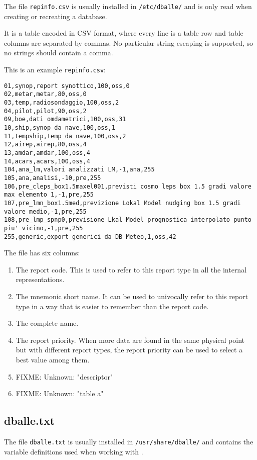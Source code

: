 The file {\tt repinfo.csv} is usually installed in {\tt /etc/dballe/} and is
only read when creating or recreating a database.

It is a table encoded in CSV format, where every line is a table row and table
columns are separated by commas.  No particular string escaping is supported,
so no strings should contain a comma.

This is an example {\tt repinfo.csv}:

\begin{verbatim}
01,synop,report synottico,100,oss,0
02,metar,metar,80,oss,0
03,temp,radiosondaggio,100,oss,2
04,pilot,pilot,90,oss,2
09,boe,dati omdametrici,100,oss,31
10,ship,synop da nave,100,oss,1
11,tempship,temp da nave,100,oss,2
12,airep,airep,80,oss,4
13,amdar,amdar,100,oss,4
14,acars,acars,100,oss,4
104,ana_lm,valori analizzati LM,-1,ana,255
105,ana,analisi,-10,pre,255
106,pre_cleps_box1.5maxel001,previsti cosmo leps box 1.5 gradi valore max elemento 1,-1,pre,255
107,pre_lmn_box1.5med,previzione Lokal Model nudging box 1.5 gradi valore medio,-1,pre,255
108,pre_lmp_spnp0,previsione Lkal Model prognostica interpolato punto piu' vicino,-1,pre,255
255,generic,export generici da DB Meteo,1,oss,42
\end{verbatim}

The file has six columns:

\begin{enumerate}
\item The report code.  This is used to refer to this report type in all the
      internal representations.
\item The mnemonic short name.  It can be used to univocally refer to this report
      type in a way that is easier to remember than the report code.
\item The complete name.
\item The report priority.  When more data are found in the same physical point
      but with different report types, the report priority can be used to
      select a best value among them.
\item FIXME: Unknown: "descriptor"
\item FIXME: Unknown: "table a"
\end{enumerate}
  
\subsection{dballe.txt}

The file {\tt dballe.txt} is usually installed in {\tt /usr/share/dballe/} and
contains the variable definitions used when working with \dballe{}.


